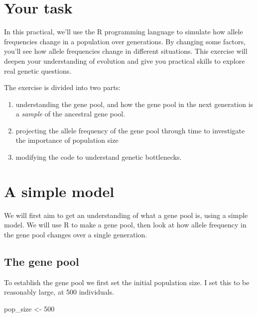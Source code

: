 \documentclass[
  a4paper]{book}
\newenvironment{Shaded}{\begin{snugshade}}{\end{snugshade}}
\newcommand{\DecValTok}[1]{\textcolor[rgb]{0.00,0.00,0.81}{#1}}
\newcommand{\NormalTok}[1]{#1}
\newcommand{\OtherTok}[1]{\textcolor[rgb]{0.56,0.35,0.01}{#1}}
\providecommand{\tightlist}{%
  \setlength{\itemsep}{0pt}\setlength{\parskip}{0pt}}
\begin{document}
\hypertarget{your-task-10}{%
\section{Your task}\label{your-task-10}}

In this practical, we'll use the R programming language to simulate how allele frequencies change in a population over generations. By changing some factors, you'll see how allele frequencies change in different situations. This exercise will deepen your understanding of evolution and give you practical skills to explore real genetic questions.

The exercise is divided into two parts:

\begin{enumerate}
\def\labelenumi{(\arabic{enumi})}
\tightlist
\item
  understanding the gene pool, and how the gene pool in the next generation is a \emph{sample} of the ancestral gene pool.
\item
  projecting the allele frequency of the gene pool through time to investigate the importance of population size
\item
  modifying the code to understand genetic bottlenecks.
\end{enumerate}

\hypertarget{a-simple-model}{%
\section{A simple model}\label{a-simple-model}}

We will first aim to get an understanding of what a gene pool is, using a simple model. We will use R to make a gene pool, then look at how allele frequency in the gene pool changes over a single generation.

\hypertarget{the-gene-pool}{%
\subsection{The gene pool}\label{the-gene-pool}}

To establish the gene pool we first set the initial population size. I set this to be reasonably large, at 500 individuals.

\begin{Shaded}
\begin{Highlighting}[]
\NormalTok{pop\_size }\OtherTok{\textless{}{-}} \DecValTok{500}
\end{Highlighting}
\end{Shaded}
\end{document}
